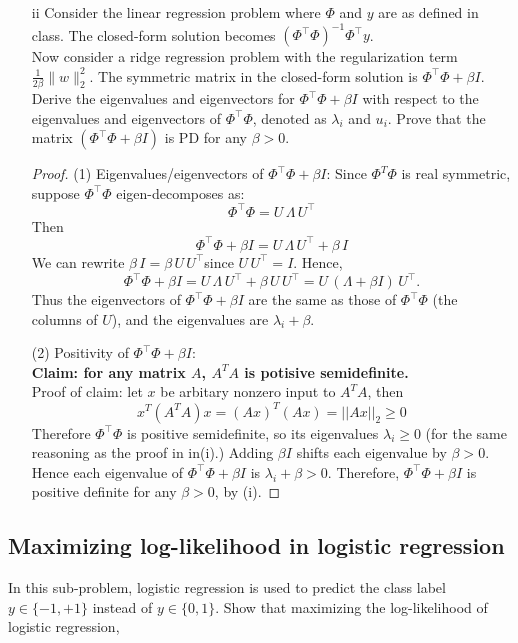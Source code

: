 \documentclass[lang=cn,11pt]{elegantbook}
\begin{document}
\begin{enumerate}
    \item[ii]  Consider the linear regression problem where \(\Phi\) and \(y\) are as defined in class. The closed-form solution becomes \((\Phi^\top \Phi)^{-1} \Phi^\top y\). \\
    Now consider a ridge regression problem with the regularization term \(\frac{1}{2\beta}\|w\|_2^2\). The symmetric matrix in the closed-form solution is \(\Phi^\top \Phi + \beta I\). Derive the eigenvalues and eigenvectors for \(\Phi^\top \Phi + \beta I\) with respect to the eigenvalues and eigenvectors of \(\Phi^\top \Phi\), denoted as \(\lambda_i\) and \(u_i\). Prove that the matrix \((\Phi^\top \Phi + \beta I)\) is PD for any \(\beta > 0\).
\begin{proof}
(1) Eigenvalues/eigenvectors of \(\Phi^\top \Phi + \beta I\): 
Since $\Phi^T\Phi$ is real symmetric, suppose \(\Phi^\top \Phi\) eigen-decomposes as:\[
   \Phi^\top \Phi = U\,\Lambda\,U^\top
   \]Then \[
   \Phi^\top \Phi + \beta I 
   = U\,\Lambda\,U^\top + \beta\,I
   \]
We can rewrite \(
   \beta\,I 
   = \beta\,U\,U^\top
   \)since \(U\,U^\top = I\). Hence, \[
   \Phi^\top \Phi + \beta I 
   = U\,\Lambda\,U^\top + \beta\,U\,U^\top
   = U\,(\Lambda + \beta I)\,U^\top.
   \]
Thus the eigenvectors of \(\Phi^\top \Phi + \beta I\) are the same as those of \(\Phi^\top \Phi\) (the columns of \(U\)), and the eigenvalues are \(\lambda_i + \beta\).

(2) Positivity of \(\Phi^\top \Phi + \beta I\):  \\
\textbf{Claim: for any matrix $A$, $A^T A$ is potisive semidefinite.}\\
\noindent Proof of claim: let $x$ be arbitary  nonzero input to $A^TA$, then
$$x^T(A^TA)x=(Ax)^T(Ax)=||Ax||_2≥0$$
Therefore \(\Phi^\top \Phi\) is positive semidefinite, so its eigenvalues \(\lambda_i \ge 0\) (for the same reasoning as the proof in in(i).) Adding \(\beta I\) shifts each eigenvalue by \(\beta > 0\). Hence each eigenvalue of \(\Phi^\top \Phi + \beta I\) is \(\lambda_i + \beta > 0\). Therefore, \(\Phi^\top \Phi + \beta I\) is positive definite for any \(\beta > 0\), by (i).
\end{proof}

\end{enumerate}



\subsection{Maximizing log-likelihood in logistic regression}
In this sub-problem, logistic regression is used to predict the class label \(y \in \{-1, +1\}\) instead of \(y \in \{0, 1\}\). Show that maximizing the log-likelihood of logistic regression,
\end{document}
